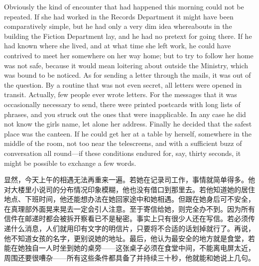 \begin{paracol}{2}
Obviously the kind of encounter that had happened this morning could not
be repeated. If she had worked in the Records Department it might have
been comparatively simple, but he had only a very dim idea whereabouts
in the building the Fiction Department lay, and he had no pretext for
going there. If he had known where she lived, and at what time she left
work, he could have contrived to meet her somewhere on her way home; but
to try to follow her home was not safe, because it would mean loitering
about outside the Ministry, which was bound to be noticed. As for
sending a letter through the mails, it was out of the question. By a
routine that was not even secret, all letters were opened in transit.
Actually, few people ever wrote letters. For the messages that it was
occasionally necessary to send, there were printed postcards with long
lists of phrases, and you struck out the ones that were inapplicable. In
any case he did not know the girl\textquotesingle s name, let alone her
address. Finally he decided that the safest place was the canteen. If he
could get her at a table by herself, somewhere in the middle of the
room, not too near the telescreens, and with a sufficient buzz of
conversation all round---if these conditions endured for, say, thirty
seconds, it might be possible to exchange a few words.

\switchcolumn

显然，今天上午的相遇无法再重来一遍。若她在记录司工作，事情就简单得多。他对大楼里小说司的分布情况印象模糊，他也没有借口到那里去。若他知道她的居住地点、下班时间，他还能想办法在她回家途中和她相遇。但跟在她身后可不安全，在真理部外面晃来晃去一定会引人注意。至于寄信给她，则完全办不到。因为所有信件在邮递时都会被拆开察看已不是秘密。事实上只有很少人还在写信。若必须传递什么消息，人们就用印有文字的明信片，只要将不合适的话划掉就行了。再说，他不知道女孩的名字，更别说她的地址。最后，他认为最安全的地方就是食堂，若能在她独自一人时坐到她的桌旁——这张桌子必须在食堂中间，不能离电屏太近，周围还要很嘈杂——所有这些条件都具备了并持续三十秒，他就能和她说上几句。

\switchcolumn*


\end{paracol}

